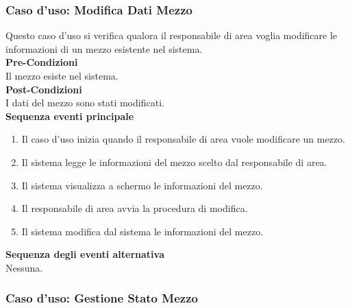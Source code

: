 \documentclass[green, fancy, 11pt]{elegantbook}
\begin{document}
\subsubsection{Caso d'uso: Modifica Dati Mezzo}

Questo caso d’uso si verifica qualora il responsabile di area voglia modificare le informazioni di un mezzo esistente nel sistema.\\
\textbf{Pre-Condizioni}\\
Il  mezzo esiste nel sistema.\\
\textbf{Post-Condizioni}\\
I dati del mezzo sono stati modificati.\\
\textbf{Sequenza eventi principale}
\begin{enumerate}
	\item Il caso d’uso inizia quando il responsabile di area vuole modificare un mezzo.
	\item Il sistema legge le informazioni del mezzo scelto dal responsabile di area.
	\item Il sistema visualizza a schermo le informazioni del mezzo.
	\item Il responsabile di area avvia la procedura di modifica.
	\item Il sistema modifica dal sistema le informazioni del mezzo.
\end{enumerate}
\textbf{Sequenza degli eventi alternativa}\\
Nessuna.

\subsubsection{Caso d'uso: Gestione Stato Mezzo}
\end{document}
